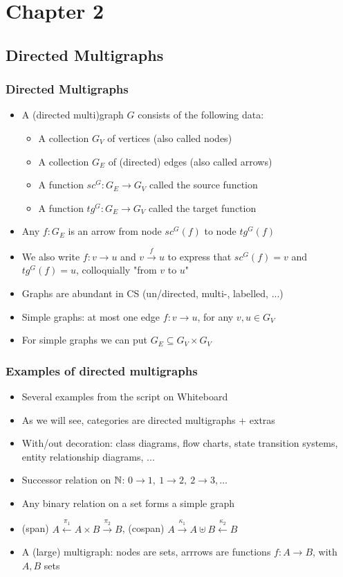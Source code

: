 \documentclass[handout]{beamer}
\title[INF223 presentations]{}
\begin{document}
\section{Chapter 2}
\subsection{Directed Multigraphs}
 
\frame
  {   
    \frametitle{Directed Multigraphs}\label{Ch2:DMG}

 \begin{itemize}[<+->]
\item A (directed multi)graph $G$ consists of the following data:
   \begin{itemize}[<+->]
\item A collection $G_V$ of vertices (also called nodes)
\item A collection $G_E$ of (directed) edges (also called arrows)
\item A function $sc^G : G_ E \to G_V$ called the source function
\item A function $tg^G : G_ E \to G_V$ called the target function
   \end{itemize}
\item Any $f:G_E$ is an arrow from node $sc^G(f)$ to node $tg^G(f)$
\item We also write $f:v\to u$ and $v \stackrel{f}{\to} u$ to express
that $sc^G(f)=v$ and $tg^G(f)=u$, colloquially  "from $v$ to $u$"
\item Graphs are abundant in CS (un/directed, multi-, labelled, ...)
\item Simple graphs: at most one edge $f:v\to u$, for any $v,u\in G_ V$
\item For simple graphs we can put $G_ E \subseteq G_V\times G_V$
 \end{itemize}

 }

\frame
  {   
    \frametitle{Examples of  directed multigraphs}\label{Ch2:DMGexamples}

 \begin{itemize}[<+->]
\item Several examples from the script on Whiteboard
\item As we will see, categories are directed multigraphs + extras
\item With/out decoration: class diagrams, flow charts, state transition systems,
entity relationship diagrams, ...
\item Successor relation on $\mathbb{N}$: $0\to 1,~1\to 2,~2\to 3,\ldots$
\item Any binary relation on a set forms a simple graph
\item (span) $A\stackrel{\pi_1}{\leftarrow} A\times B \stackrel{\pi_2}{\to} B$,
(cospan) $A\stackrel{\kappa_1}{\to} A\uplus B \stackrel{\kappa_2}{\leftarrow} B$
\item A (large) multigraph: nodes are sets, arrrows are functions $f:A\to B$,
with $A,B$ sets
 \end{itemize}

 }
\end{document}
